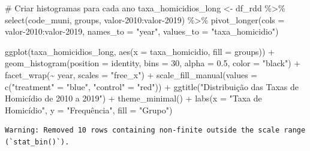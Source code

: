 \documentclass[
  letterpaper,
  DIV=11,
  numbers=noendperiod]{scrartcl}
\newenvironment{Shaded}{\begin{snugshade}}{\end{snugshade}}
\newcommand{\AttributeTok}[1]{\textcolor[rgb]{0.40,0.45,0.13}{#1}}
\newcommand{\CommentTok}[1]{\textcolor[rgb]{0.37,0.37,0.37}{#1}}
\newcommand{\DecValTok}[1]{\textcolor[rgb]{0.68,0.00,0.00}{#1}}
\newcommand{\FloatTok}[1]{\textcolor[rgb]{0.68,0.00,0.00}{#1}}
\newcommand{\FunctionTok}[1]{\textcolor[rgb]{0.28,0.35,0.67}{#1}}
\newcommand{\NormalTok}[1]{\textcolor[rgb]{0.00,0.23,0.31}{#1}}
\newcommand{\OtherTok}[1]{\textcolor[rgb]{0.00,0.23,0.31}{#1}}
\newcommand{\SpecialCharTok}[1]{\textcolor[rgb]{0.37,0.37,0.37}{#1}}
\newcommand{\StringTok}[1]{\textcolor[rgb]{0.13,0.47,0.30}{#1}}
\begin{document}
\begin{Shaded}
\begin{Highlighting}[]
\CommentTok{\# Criar histogramas para cada ano}
\NormalTok{taxa\_homicidios\_long }\OtherTok{\textless{}{-}}\NormalTok{ df\_rdd }\SpecialCharTok{\%\textgreater{}\%} 
  \FunctionTok{select}\NormalTok{(code\_muni, groups, }\StringTok{\textasciigrave{}}\AttributeTok{valor{-}2010}\StringTok{\textasciigrave{}}\SpecialCharTok{:}\StringTok{\textasciigrave{}}\AttributeTok{valor{-}2019}\StringTok{\textasciigrave{}}\NormalTok{) }\SpecialCharTok{\%\textgreater{}\%}
  \FunctionTok{pivot\_longer}\NormalTok{(}\AttributeTok{cols =} \StringTok{\textasciigrave{}}\AttributeTok{valor{-}2010}\StringTok{\textasciigrave{}}\SpecialCharTok{:}\StringTok{\textasciigrave{}}\AttributeTok{valor{-}2019}\StringTok{\textasciigrave{}}\NormalTok{, }\AttributeTok{names\_to =} \StringTok{"year"}\NormalTok{, }\AttributeTok{values\_to =} \StringTok{"taxa\_homicidio"}\NormalTok{)}

\FunctionTok{ggplot}\NormalTok{(taxa\_homicidios\_long, }\FunctionTok{aes}\NormalTok{(}\AttributeTok{x =}\NormalTok{ taxa\_homicidio, }\AttributeTok{fill =}\NormalTok{ groups)) }\SpecialCharTok{+}
  \FunctionTok{geom\_histogram}\NormalTok{(}\AttributeTok{position =} \StringTok{\textquotesingle{}identity\textquotesingle{}}\NormalTok{, }\AttributeTok{bins =} \DecValTok{30}\NormalTok{, }\AttributeTok{alpha =} \FloatTok{0.5}\NormalTok{, }\AttributeTok{color =} \StringTok{"black"}\NormalTok{) }\SpecialCharTok{+}
  \FunctionTok{facet\_wrap}\NormalTok{(}\SpecialCharTok{\textasciitilde{}}\NormalTok{ year, }\AttributeTok{scales =} \StringTok{"free\_x"}\NormalTok{) }\SpecialCharTok{+}
  \FunctionTok{scale\_fill\_manual}\NormalTok{(}\AttributeTok{values =} \FunctionTok{c}\NormalTok{(}\StringTok{"treatment"} \OtherTok{=} \StringTok{"blue"}\NormalTok{, }\StringTok{"control"} \OtherTok{=} \StringTok{"red"}\NormalTok{)) }\SpecialCharTok{+}
  \FunctionTok{ggtitle}\NormalTok{(}\StringTok{"Distribuição das Taxas de Homicídio de 2010 a 2019"}\NormalTok{) }\SpecialCharTok{+}
  \FunctionTok{theme\_minimal}\NormalTok{() }\SpecialCharTok{+}
  \FunctionTok{labs}\NormalTok{(}\AttributeTok{x =} \StringTok{"Taxa de Homicídio"}\NormalTok{, }\AttributeTok{y =} \StringTok{"Frequência"}\NormalTok{, }\AttributeTok{fill =} \StringTok{"Grupo"}\NormalTok{)}
\end{Highlighting}
\end{Shaded}

\begin{verbatim}
Warning: Removed 10 rows containing non-finite outside the scale range
(`stat_bin()`).
\end{verbatim}
\end{document}
